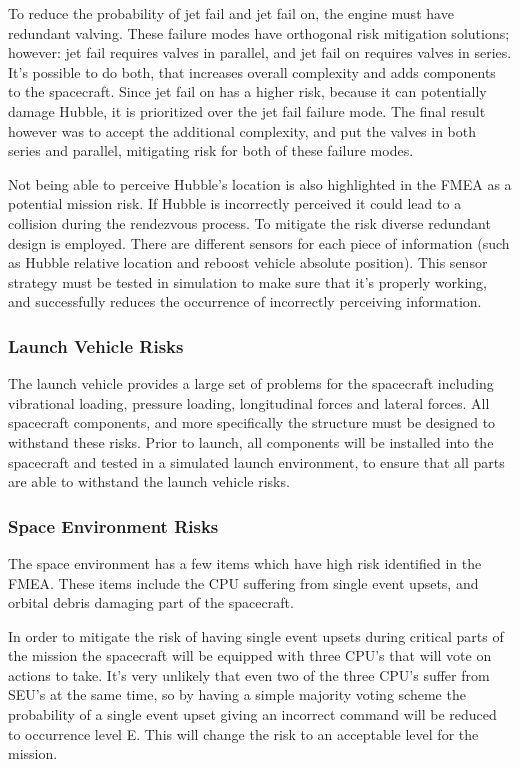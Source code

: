 \documentclass[paper=letter, fontsize=11pt]{scrartcl} %
\numberwithin{equation}{section} %
\numberwithin{figure}{section} %
\numberwithin{table}{section} %
\begin{document}
To reduce the probability of jet fail and jet fail on, the engine must have redundant valving. These failure modes have orthogonal risk mitigation solutions; however: jet fail requires valves in parallel, and jet fail on requires valves in series. It's possible to do both, that increases overall complexity and adds components to the spacecraft. Since jet fail on has a higher risk, because it can potentially damage Hubble, it is prioritized over the jet fail failure mode. The final result however was to accept the additional complexity, and put the valves in both series and parallel, mitigating risk for both of these failure modes.

Not being able to perceive Hubble's location is also highlighted in the FMEA as a potential mission risk. If Hubble is incorrectly perceived it could lead to a collision during the rendezvous process. To mitigate the risk diverse redundant design is employed. There are different sensors for each piece of information (such as Hubble relative location and reboost vehicle absolute position). This sensor strategy must be tested in simulation to make sure that it's properly working, and successfully reduces the occurrence of incorrectly perceiving information.

\subsubsection{Launch Vehicle Risks}
The launch vehicle provides a large set of problems for the spacecraft including vibrational loading, pressure loading, longitudinal forces and lateral forces. All spacecraft components, and more specifically the structure must be designed to withstand these risks. Prior to launch, all components will be installed into the spacecraft and tested in a simulated launch environment, to ensure that all parts are able to withstand the launch vehicle risks.

\subsubsection{Space Environment Risks}
The space environment has a few items which have high risk identified in the FMEA. These items include the CPU suffering from single event upsets, and orbital debris damaging part of the spacecraft.

In order to mitigate the risk of having single event upsets during critical parts of the mission the spacecraft will be equipped with three CPU's that will vote on actions to take. It's very unlikely that even two of the three CPU's suffer from SEU's at the same time, so by having a simple majority voting scheme the probability of a single event upset giving an incorrect command will be reduced to occurrence level E. This will change the risk to an acceptable level for the mission.
\end{document}
